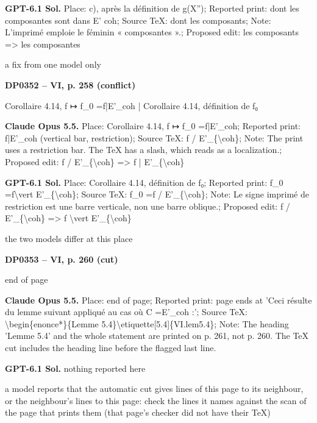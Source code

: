 \textbf{GPT-6.1 Sol.} Place: c), après la définition de g(X''); Reported print: dont les composantes sont dans E' coh; Source TeX: dont les composants; Note: L'imprimé emploie le féminin « composantes ».; Proposed edit: les composants =\allowbreak > les composantes\par
a fix from one model only\par
\par\noindent\hypertarget{DP0352}{}\textbf{DP0352 -- VI, p. 258 (conflict)}\par
Corollaire 4.14, f ↦ f\_0 =\allowbreak  f|E'\_coh | Corollaire 4.14, définition de f₀\par
\textbf{Claude Opus 5.5.} Place: Corollaire 4.14, f ↦ f\_0 =\allowbreak  f|E'\_coh; Reported print: f|E'\_coh (vertical bar, restriction); Source TeX: f / E'\_\{\textbackslash{}coh\}; Note: The print uses a restriction bar. The TeX has a slash, which reads as a localization.; Proposed edit: f / E'\_\{\textbackslash{}coh\} =\allowbreak > f | E'\_\{\textbackslash{}coh\}\par
\textbf{GPT-6.1 Sol.} Place: Corollaire 4.14, définition de f₀; Reported print: f\_0 =\allowbreak  f\textbackslash{}vert E'\_\{\textbackslash{}coh\}; Source TeX: f\_0 =\allowbreak  f / E'\_\{\textbackslash{}coh\}; Note: Le signe imprimé de restriction est une barre verticale, non une barre oblique.; Proposed edit: f / E'\_\{\textbackslash{}coh\} =\allowbreak > f \textbackslash{}vert E'\_\{\textbackslash{}coh\}\par
the two models differ at this place\par
\par\noindent\hypertarget{DP0353}{}\textbf{DP0353 -- VI, p. 260 (cut)}\par
end of page\par
\textbf{Claude Opus 5.5.} Place: end of page; Reported print: page ends at 'Ceci résulte du lemme suivant appliqué au cas où C =\allowbreak  E'\_coh :'; Source TeX: \textbackslash{}begin\{enonce*\}\{Lemme 5.4\}\textbackslash{}etiquette[5.4]\{VI.lem5.4\}; Note: The heading 'Lemme 5.4' and the whole statement are printed on p. 261, not p. 260. The TeX cut includes the heading line before the flagged last line.\par
\textbf{GPT-6.1 Sol.} nothing reported here\par
a model reports that the automatic cut gives lines of this page to its neighbour, or the neighbour's lines to this page: check the lines it names against the scan of the page that prints them (that page's checker did not have their TeX)\par
